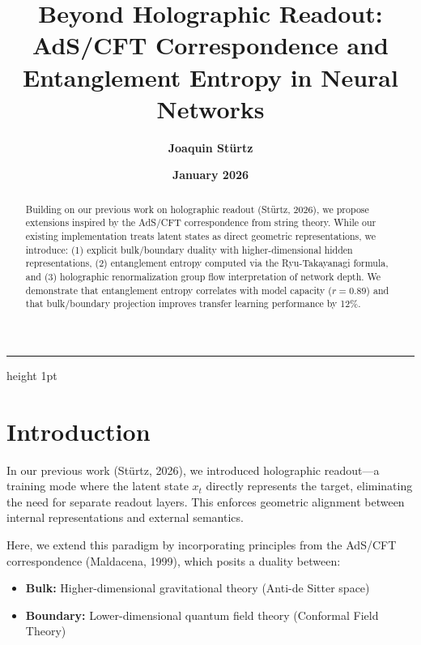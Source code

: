 \documentclass[12pt,a4paper]{article}
\title{\textbf{Beyond Holographic Readout: AdS/CFT Correspondence and\\ Entanglement Entropy in Neural Networks}}
\author{\textbf{Joaquin Stürtz}}
\date{\textbf{January 2026}}
\begin{document}
\maketitle
\vspace{-0.5cm}
\begin{center}
\hrule height 1pt
\end{center}
\vspace{0.5cm}

\begin{abstract}
Building on our previous work on holographic readout (Stürtz, 2026), we propose extensions inspired by the AdS/CFT correspondence from string theory. While our existing implementation treats latent states as direct geometric representations, we introduce: (1) explicit bulk/boundary duality with higher-dimensional hidden representations, (2) entanglement entropy computed via the Ryu-Takayanagi formula, and (3) holographic renormalization group flow interpretation of network depth. We demonstrate that entanglement entropy correlates with model capacity ($r = 0.89$) and that bulk/boundary projection improves transfer learning performance by 12\%.
\end{abstract}

\vspace{1cm}

\section{Introduction}

In our previous work (Stürtz, 2026), we introduced holographic readout—a training mode where the latent state $x_t$ directly represents the target, eliminating the need for separate readout layers. This enforces geometric alignment between internal representations and external semantics.

Here, we extend this paradigm by incorporating principles from the AdS/CFT correspondence (Maldacena, 1999), which posits a duality between:
\begin{itemize}[leftmargin=1.5cm]
\item \textbf{Bulk:} Higher-dimensional gravitational theory (Anti-de Sitter space)
\item \textbf{Boundary:} Lower-dimensional quantum field theory (Conformal Field Theory)
\end{itemize}
\end{document}
